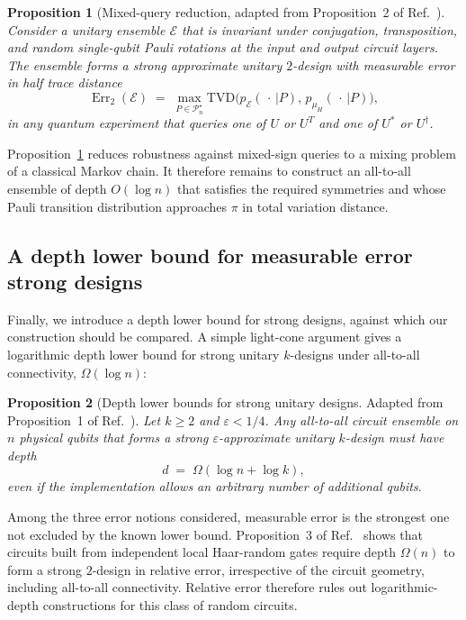 \documentclass[
    aps,
    superscriptaddress,
    onecolumn,
    10pt,
    prx,
    nofootinbib
]{revtex4-2}
\newtheorem{proposition}{Proposition}
\theoremstyle{namedstatement}
\theoremstyle{plain}
\begin{document}
\begin{proposition}[Mixed-query reduction, adapted from Proposition~2 of
Ref.~\cite{SchusterEtAlStrong2025}]
\label{pro:mixed_query_reduction}
Consider a unitary ensemble $\mathcal{E}$ that is invariant under
conjugation, transposition, and random single-qubit Pauli rotations at the
input and output circuit layers.
 The ensemble forms a strong approximate unitary $2$-design with measurable error in half trace distance
\begin{equation}
\operatorname{Err}_{2}(\mathcal{E}) \;=\; \max_{P\in\mathcal{P}_{n}^{\star}}
\mathrm{TVD}\bigl(p_{\mathcal{E}}(\,\cdot\,|P),\,p_{\mu_H}(\,\cdot\,|P)\bigr),
 \end{equation}
 in any quantum experiment that queries one of $U$ or $U^{T}$ and one of $U^{*}$ or $U^{\dagger}$.
\end{proposition}
Proposition~\ref{pro:mixed_query_reduction} reduces robustness against mixed-sign queries to a mixing problem of a classical Markov chain. It therefore remains to construct an all-to-all ensemble of depth $O(\log n)$ that satisfies the required symmetries and whose Pauli transition distribution approaches $\pi$ in total variation distance.




\subsection{A depth lower bound for measurable error strong designs}
Finally, we introduce a depth lower bound for strong designs, against which our construction should be compared. A simple light-cone argument gives a logarithmic depth lower bound for strong unitary $k$-designs under all-to-all connectivity, $\Omega(\log n)$:

\begin{proposition}[Depth lower
bounds for strong unitary designs. Adapted from Proposition~1 of Ref.~\cite{SchusterEtAlStrong2025}]
Let $k\geq 2$ and $\varepsilon<1/4$. Any all-to-all circuit ensemble on $n$ physical qubits
that forms a strong $\varepsilon$-approximate unitary $k$-design 
must have depth
\begin{equation}
\label{eq:lb_alltoall}
    d \;=\; \Omega\!\left(\log n+\log k\right),
\end{equation}
even if the implementation allows an arbitrary number of additional qubits.
\label{pro:lower_bound}
\end{proposition}

Among the three error notions considered, measurable error is the strongest one not excluded by the known lower bound. Proposition~3 of Ref.~\cite{SchusterEtAlStrong2025} shows that circuits built from independent local Haar-random gates require depth $\Omega(n)$ to form a strong $2$-design in relative error, irrespective of the circuit geometry, including all-to-all connectivity. Relative error therefore rules out logarithmic-depth constructions for this class of random circuits.
\end{document}
